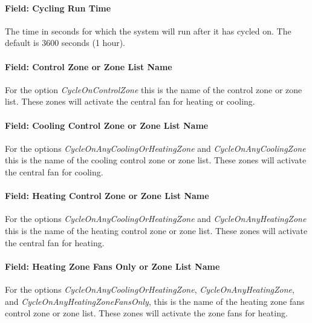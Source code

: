 \paragraph{Field: Cycling Run Time}\label{field-cycling-run-time}

The time in seconds for which the system will run after it has cycled on. The default is 3600 seconds (1 hour).

\paragraph{Field: Control Zone or Zone List Name}\label{field-control-zone-or-zone-list-name}

For the option \emph{CycleOnControlZone} this is the name of the control zone or zone list. These zones will activate the central fan for heating or cooling.

\paragraph{Field: Cooling Control Zone or Zone List Name}\label{field-cooling-control-zone-or-zone-list-name}

For the options \emph{CycleOnAnyCoolingOrHeatingZone} and  \emph{CycleOnAnyCoolingZone}  this is the name of the cooling control zone or zone list. These zones will activate the central fan for cooling.

\paragraph{Field: Heating Control Zone or Zone List Name}\label{field-heating-control-zone-or-zone-list-name}

For the options \emph{CycleOnAnyCoolingOrHeatingZone} and  \emph{CycleOnAnyHeatingZone}  this is the name of the heating control zone or zone list. These zones will activate the central fan for heating.

\paragraph{Field: Heating Zone Fans Only or Zone List Name}\label{field-heating-zone-fans-only-or-zone-list-name}

For the options \emph{CycleOnAnyCoolingOrHeatingZone}, \emph{CycleOnAnyHeatingZone}, and \emph{CycleOnAnyHeatingZoneFansOnly},  this is the name of the heating zone fans control zone or zone list. These zones will activate the zone fans for heating.

